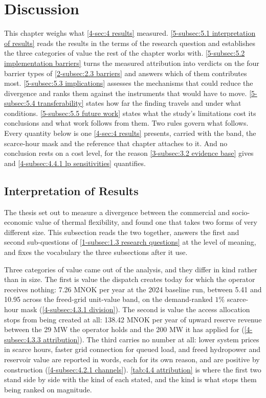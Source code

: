 \section{Discussion}
\label{5-sec:5 discussion}

This chapter weighs what \autoref{4-sec:4 results} measured. \autoref{5-subsec:5.1 interpretation of results} reads the results in the terms of the research question and establishes the three categories of value the rest of the chapter works with. \autoref{5-subsec:5.2 implementation barriers} turns the measured attribution into verdicts on the four barrier types of \autoref{2-subsec:2.3 barriers} and answers which of them contributes most. \autoref{5-subsec:5.3 implications} assesses the mechanisms that could reduce the divergence and ranks them against the instruments that would have to move. \autoref{5-subsec:5.4 transferability} states how far the finding travels and under what conditions. \autoref{5-subsec:5.5 future work} states what the study's limitations cost its conclusions and what work follows from them. Two rules govern what follows. Every quantity below is one \autoref{4-sec:4 results} presents, carried with the band, the scarce-hour mask and the reference that chapter attaches to it. And no conclusion rests on a cost level, for the reason \autoref{3-subsec:3.2 evidence base} gives and \autoref{4-subsec:4.4.1 lp sensitivities} quantifies.

\subsection{Interpretation of Results}
\label{5-subsec:5.1 interpretation of results}

The thesis set out to measure a divergence between the commercial and socio-economic value of thermal flexibility, and found one that takes two forms of very different size. This subsection reads the two together, answers the first and second sub-questions of \autoref{1-subsec:1.3 research questions} at the level of meaning, and fixes the vocabulary the three subsections after it use.

Three categories of value came out of the analysis, and they differ in kind rather than in size. The first is value the dispatch creates today for which the operator receives nothing: 7.26 MNOK per year at the 2024 baseline run, between 5.41 and 10.95 across the freed-grid unit-value band, on the demand-ranked $1\%$ scarce-hour mask (\autoref{4-subsec:4.3.1 division}). The second is value the access allocation stops from being created at all: 138.42 MNOK per year of upward reserve revenue between the 29 MW the operator holds and the 200 MW it has applied for (\autoref{4-subsec:4.3.3 attribution}). The third carries no number at all: lower system prices in scarce hours, faster grid connection for queued load, and freed hydropower and reservoir value are reported in words, each for its own reason, and are positive by construction (\autoref{4-subsec:4.2.1 channels}). \autoref{tab:4.4 attribution} is where the first two stand side by side with the kind of each stated, and the kind is what stops them being ranked on magnitude.

